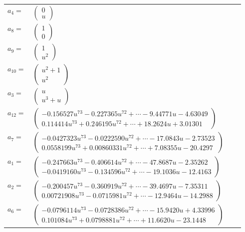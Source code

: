 \documentclass[1p]{elsarticle_modified}
\theoremstyle{definition}
\begin{document}
\begin{tabular}{m{7pt} m{180pt} m{7pt} m{180pt} }
\flushright $a_{4}=$&$\begin{pmatrix}0\\u\end{pmatrix}$ \\
\flushright $a_{8}=$&$\begin{pmatrix}1\\0\end{pmatrix}$ \\
\flushright $a_{9}=$&$\begin{pmatrix}1\\u^2\end{pmatrix}$ \\
\flushright $a_{10}=$&$\begin{pmatrix}u^2+1\\u^2\end{pmatrix}$ \\
\flushright $a_{3}=$&$\begin{pmatrix}u\\u^3+u\end{pmatrix}$ \\
\flushright $a_{12}=$&$\begin{pmatrix}-0.156527 u^{73}-0.227365 u^{72}+\cdots-9.44771 u-4.63049\\0.114414 u^{73}+0.246195 u^{72}+\cdots+18.2624 u+3.01301\end{pmatrix}$ \\
\flushright $a_{7}=$&$\begin{pmatrix}-0.0427323 u^{73}-0.0222590 u^{72}+\cdots-17.0843 u-2.73523\\0.0558199 u^{73}+0.00860331 u^{72}+\cdots+7.08355 u-20.4297\end{pmatrix}$ \\
\flushright $a_{1}=$&$\begin{pmatrix}-0.247663 u^{73}-0.406614 u^{72}+\cdots-47.8687 u-2.35262\\-0.0419160 u^{73}-0.134596 u^{72}+\cdots-19.1036 u-12.4163\end{pmatrix}$ \\
\flushright $a_{2}=$&$\begin{pmatrix}-0.200457 u^{73}-0.360919 u^{72}+\cdots-39.4697 u-7.35311\\0.00721908 u^{73}-0.0715981 u^{72}+\cdots-12.9464 u-14.2988\end{pmatrix}$ \\
\flushright $a_{6}=$&$\begin{pmatrix}-0.0796114 u^{73}-0.0728386 u^{72}+\cdots-15.9420 u+4.33996\\0.101084 u^{73}+0.0798881 u^{72}+\cdots+11.6620 u-23.1448\end{pmatrix}$ \\

\end{tabular}
\end{document}
